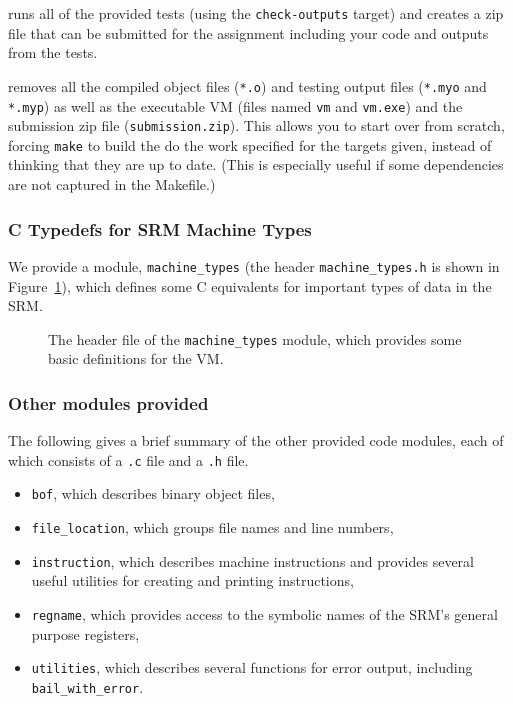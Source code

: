 \documentclass[11pt,letterpaper]{article}
\newcommand{\LSTCFILE}[1]{

}
\newcommand{\figref}[1]{Figure~\ref{#1}}  %
\begin{document}
\begin{description}
\item{} runs all of the provided tests (using the
  \texttt{check-outputs} target) and creates a zip file that can be
  submitted for the assignment including your code and outputs from
  the tests.

\item{} removes all the compiled object files (\texttt{*.o}) and testing
  output files (\texttt{*.myo} and \texttt{*.myp}) as well as the
  executable VM (files named \texttt{vm} and \texttt{vm.exe}) and the
  submission zip file (\texttt{submission.zip}). This allows you to
  start over from scratch, forcing \texttt{make} to build the do the
  work specified for the targets given, instead of thinking that they
  are up to date. (This is especially useful if some dependencies are
  not captured in the Makefile.)
\end{description}

\subsubsection{C Typedefs for SRM Machine Types}

We provide a module, \lstinline!machine_types! (the header
\lstinline!machine_types.h! is shown in \figref{fig:machinetypes}),
which defines some C equivalents for important types of data in the SRM.

\begin{figure}
\LSTCFILE{machine_types.h}
\caption{The header file of the \texttt{machine\_types} module, which
  provides some basic definitions for the VM.}
\label{fig:machinetypes}
\end{figure}

\subsubsection{Other modules provided}

The following gives a brief summary of the other provided code
modules, each of which consists of a \texttt{.c} file and a
\texttt{.h} file.

\begin{itemize}
\item
  \lstinline!bof!, which describes binary object files,

\item
  \lstinline!file_location!, which groups file names and line numbers,

\item
  \lstinline!instruction!, which describes machine instructions and
  provides several useful utilities for creating and printing
  instructions,

\item
  \lstinline!regname!, which provides access to the symbolic names of
  the SRM's general purpose registers,
  
\item
  \lstinline!utilities!, which describes several functions for error
  output, including \lstinline!bail_with_error!.
\end{itemize}
\end{document}
